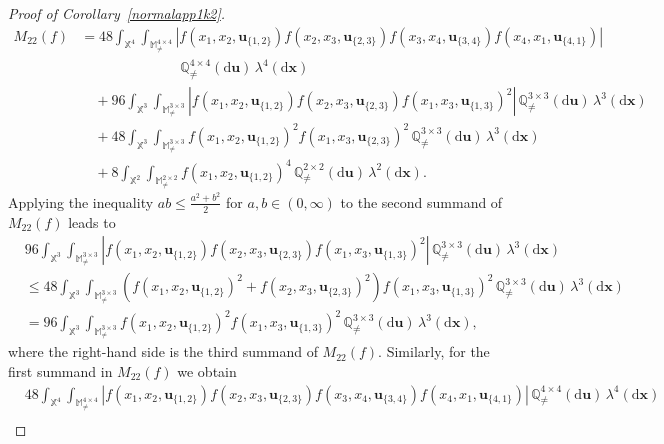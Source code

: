 \documentclass{article}
\theoremstyle{definition}
\numberwithin{equation}{section}
\theoremstyle{remark}
\begin{document}
\begin{proof}[Proof of Corollary~\ref{normalapp1k2}]
\begin{align*}
M_{22}(f) & = 48\int_{\mathbb{X}^4} \int_{\mathbb{M}_{\neq}^{4\times 4}} |f(x_1,x_2,\mathbf{u}_{\{1,2\}}) f(x_2,x_3,\mathbf{u}_{\{2,3\}}) f(x_3,x_4,\mathbf{u}_{\{3,4\}}) f(x_4,x_1,\mathbf{u}_{\{4,1\}})| \\
& \hspace{3cm} \mathbb{Q}_{\neq}^{4\times 4}(\mathrm{d}\mathbf{u}) \, \lambda^4(\mathrm{d}\mathbf{x}) \\
& \quad + 96 \int_{\mathbb{X}^3} \int_{\mathbb{M}_{\neq}^{3\times 3}} |f(x_1,x_2,\mathbf{u}_{\{1,2\}}) f(x_2,x_3,\mathbf{u}_{\{2,3\}}) f(x_1,x_3,\mathbf{u}_{\{1,3\}})^2| \, \mathbb{Q}_{\neq}^{3\times 3}(\mathrm{d}\mathbf{u}) \, \lambda^3(\mathrm{d}\mathbf{x}) \\
& \quad + 48 \int_{\mathbb{X}^3} \int_{\mathbb{M}_{\neq}^{3\times 3}} f(x_1,x_2,\mathbf{u}_{\{1,2\}})^2 f(x_1,x_3,\mathbf{u}_{\{2,3\}})^2 \, \mathbb{Q}_{\neq}^{3\times 3}(\mathrm{d}\mathbf{u}) \, \lambda^3(\mathrm{d}\mathbf{x}) \\
& \quad + 8 \int_{\mathbb{X}^2} \int_{\mathbb{M}_{\neq}^{2\times 2}} f(x_1,x_2,\mathbf{u}_{\{1,2\}})^4 \, \mathbb{Q}_{\neq}^{2\times 2}(\mathrm{d}\mathbf{u}) \, \lambda^2(\mathrm{d}\mathbf{x}).
\end{align*}
Applying the inequality $ab\leq \frac{a^2+b^2}{2}$ for $a,b\in(0,\infty)$ to the second summand of $M_{22}(f)$ leads to
\begin{align*}
& 96 \int_{\mathbb{X}^3} \int_{\mathbb{M}_{\neq}^{3\times 3}} |f(x_1,x_2,\mathbf{u}_{\{1,2\}}) f(x_2,x_3,\mathbf{u}_{\{2,3\}}) f(x_1,x_3,\mathbf{u}_{\{1,3\}})^2| \, \mathbb{Q}_{\neq}^{3\times 3}(\mathrm{d}\mathbf{u}) \, \lambda^3(\mathrm{d}\mathbf{x}) \\
& \leq  48 \int_{\mathbb{X}^3} \int_{\mathbb{M}_{\neq}^{3\times 3}} (f(x_1,x_2,\mathbf{u}_{\{1,2\}})^2 + f(x_2,x_3,\mathbf{u}_{\{2,3\}})^2) f(x_1,x_3,\mathbf{u}_{\{1,3\}})^2 \, \mathbb{Q}_{\neq}^{3\times 3}(\mathrm{d}\mathbf{u}) \, \lambda^3(\mathrm{d}\mathbf{x}) \\
& = 96 \int_{\mathbb{X}^3} \int_{\mathbb{M}_{\neq}^{3\times 3}} f(x_1,x_2,\mathbf{u}_{\{1,2\}})^2 f(x_1,x_3,\mathbf{u}_{\{1,3\}})^2 \, \mathbb{Q}_{\neq}^{3\times 3}(\mathrm{d}\mathbf{u}) \, \lambda^3(\mathrm{d}\mathbf{x}),
\end{align*}
where the right-hand side is the third summand of $M_{22}(f)$. Similarly, for the first summand in $M_{22}(f)$ we obtain
\begin{align*}
& 48\int_{\mathbb{X}^4} \int_{\mathbb{M}_{\neq}^{4\times 4}} |f(x_1,x_2,\mathbf{u}_{\{1,2\}}) f(x_2,x_3,\mathbf{u}_{\{2,3\}}) f(x_3,x_4,\mathbf{u}_{\{3,4\}}) f(x_4,x_1,\mathbf{u}_{\{4,1\}})| \, \mathbb{Q}_{\neq}^{4\times 4}(\mathrm{d}\mathbf{u}) \, \lambda^4(\mathrm{d}\mathbf{x}) \\

\end{align*}
\end{proof}
\end{document}
